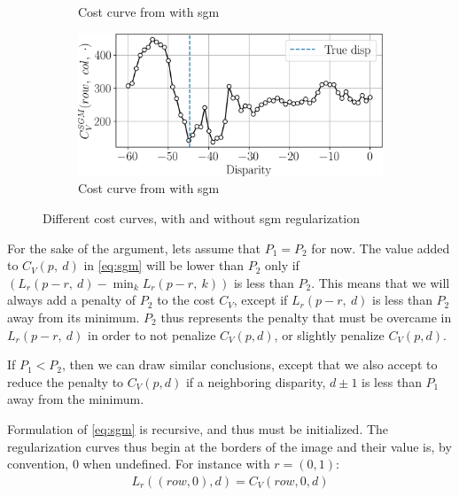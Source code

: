 \begin{figure}
\begin{subfigure}[t]{0.49\linewidth}
        \caption{Cost curve from  with \acrshort{sgm}}
        \label{fig:cost_curve_sgm_row_100_col_250}
    \end{subfigure}\hfill
    \begin{subfigure}[t]{0.49\linewidth}
        \flushright
        \includegraphics[width=\linewidth]{Images/Chap_1/cost_curve_sgm_row_276_col_360.png}
        \caption{Cost curve from  with \acrshort{sgm}}
        \label{fig:cost_curve_sgm_row_276_col_360}
    \end{subfigure}
    \caption{Different cost curves, with and without \acrshort{sgm} regularization}
    \label{fig:cost_curve_with_without_sgm}
\end{figure}

\begin{remark}
    For the sake of the argument, lets assume that $P_1=P_2$ for now. The value added to $C_V(p, ~d)$ in \eqref{eq:sgm} will be lower than $P_2$ only if $(L_r(p-r,~d) - \min_k L_r(p-r,~k))$ is less than $P_2$. This means that we will always add a penalty of $P_2$ to the cost $C_V$, except if $L_r(p-r,~d)$ is less than $P_2$ away from its minimum. $P_2$ thus represents the penalty that must be overcame in $L_r(p-r,~d)$ in order to not penalize $C_V(p,d)$, or slightly penalize $C_V(p,d)$.
    
    If $P_1<P_2$, then we can draw similar conclusions, except that we also accept to reduce the penalty to $C_V(p,d)$ if a neighboring disparity, \ie $d\pm1$ is less than $P_1$ away from the minimum.
\end{remark}

Formulation of \cref{eq:sgm} is recursive, and thus must be initialized. The regularization curves thus begin at the borders of the image and their value is, by convention, $0$ when undefined. For instance with $r=(0,1)$:
\begin{align*}
    L_r((row, 0),d) = C_V(row, 0 ,d)
\end{align*} 

